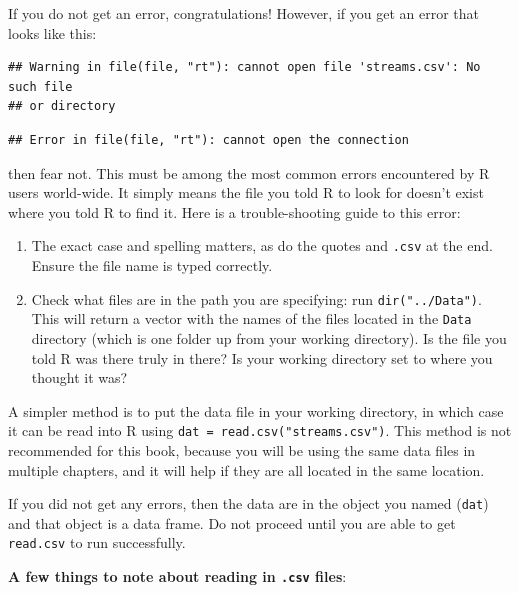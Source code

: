 \documentclass[]{book}
\providecommand{\tightlist}{%
  \setlength{\itemsep}{0pt}\setlength{\parskip}{0pt}}
\begin{document}
If you do not get an error, congratulations! However, if you get an error that looks like this:

\begin{verbatim}
## Warning in file(file, "rt"): cannot open file 'streams.csv': No such file
## or directory
\end{verbatim}

\begin{verbatim}
## Error in file(file, "rt"): cannot open the connection
\end{verbatim}

then fear not. This must be among the most common errors encountered by R users world-wide. It simply means the file you told R to look for doesn't exist where you told R to find it. Here is a trouble-shooting guide to this error:

\begin{enumerate}
\def\labelenumi{\arabic{enumi}.}
\tightlist
\item
  The exact case and spelling matters, as do the quotes and \texttt{.csv} at the end. Ensure the file name is typed correctly.
\item
  Check what files are in the path you are specifying: run \texttt{dir("../Data")}. This will return a vector with the names of the files located in the \texttt{Data} directory (which is one folder up from your working directory). Is the file you told R was there truly in there? Is your working directory set to where you thought it was?
\end{enumerate}

A simpler method is to put the data file in your working directory, in which case it can be read into R using \texttt{dat\ =\ read.csv("streams.csv")}. This method is not recommended for this book, because you will be using the same data files in multiple chapters, and it will help if they are all located in the same location.

If you did not get any errors, then the data are in the object you named (\texttt{dat}) and that object is a data frame. Do not proceed until you are able to get \texttt{read.csv} to run successfully.

\textbf{A few things to note about reading in \texttt{.csv} files}:
\end{document}

